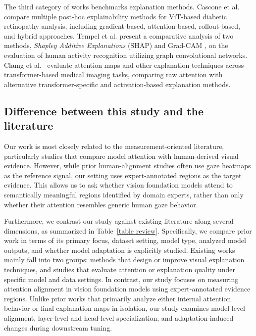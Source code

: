 \documentclass[lineno,pdflatex,sn-mathphys-num]{sn-jnl}%
\theoremstyle{thmstyleone}%
\theoremstyle{thmstyletwo}%
\theoremstyle{thmstylethree}%
\begin{document}
The third category of works benchmarks explanation methods. Cascone et al.~\cite{Cascone2026947} compare multiple post-hoc explainability methods for ViT-based diabetic retinopathy analysis, including gradient-based, attention-based, rollout-based, and hybrid approaches. Tempel et al. \cite{Tempel2025} present a comparative analysis of two methods, \textit{Shapley Additive Explanations} (SHAP) \cite{Lundberg17SHAP} and Grad-CAM \cite{Selvaraju17GradCAM}, on the evaluation of human activity recognition utilizing graph convolutional networks. Chung et al.~\cite{Chung2025110} evaluate attention maps and other explanation techniques across transformer-based medical imaging tasks, comparing raw attention with alternative transformer-specific and activation-based explanation methods.

\subsection{Difference between this study and the literature}

Our work is most closely related to the measurement-oriented literature, particularly studies that compare model attention with human-derived visual evidence. However, while prior human-alignment studies often use gaze heatmaps as the reference signal, our setting uses expert-annotated regions as the target evidence. This allows us to ask whether vision foundation models attend to semantically meaningful regions identified by domain experts, rather than only whether their attention resembles generic human gaze behavior.

Furthermore, we contrast our study against existing literature along several dimensions, as summarized in Table~\ref{table review}. Specifically, we compare prior work in terms of its primary focus, dataset setting, model type, analyzed model outputs, and whether model adaptation is explicitly studied. Existing works mainly fall into two groups: methods that design or improve visual explanation techniques, and studies that evaluate attention or explanation quality under specific model and data settings. In contrast, our study focuses on measuring attention alignment in vision foundation models using expert-annotated evidence regions. Unlike prior works that primarily analyze either internal attention behavior or final explanation maps in isolation, our study examines model-level alignment, layer-level and head-level specialization, and adaptation-induced changes during downstream tuning.
\end{document}
